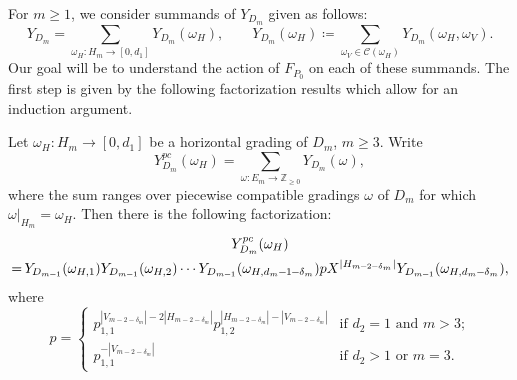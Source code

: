 \documentclass[ALCO,ThmDefs,Unicode,epreuves]{cedram}
\newcommand{\cC}{\mathcal{C}}
\newcommand{\ZZ}{\mathbb{Z}}
\newcommand*{\mk}{\mkern -1mu}
\newcommand*{\Mk}{\mkern -2mu}
\begin{document}
For $m\ge1$, we consider summands of $Y_{D_m}$ given as follows:
\begin{equation}
 \label{eq:Y decomposition}
 Y_{D_m}=\sum_{\omega_H:H_m\to[0,d_1]}Y_{D_m}(\omega_H),\qquad Y_{D_m}(\omega_H)\coloneqq \sum_{\omega_V\in\cC(\omega_H)}Y_{D_m}(\omega_H,\omega_V).
\end{equation}
Our goal will be to understand the action of $F_{P_0}$ on each of these summands.
The first step is given by the following factorization results which allow for an induction argument.
\begin{lemma}
 \label{le:piecewise compatible factorization 1}
 Let $\omega_H:H_m\to[0,d_1]$ be a horizontal grading of $D_m$, $m\ge3$.
 Write 
 \[Y_{D_m}^{pc}(\omega_H)=\sum\limits_{\omega:E_m\to\ZZ_{\ge0}}Y_{D_m}(\omega),\]
 where the sum ranges over piecewise compatible gradings $\omega$ of $D_m$ for which $\omega|_{H_m}=\omega_H$.
 Then there is the following factorization:
 \begin{multline}
 \label{eq:piecewise compatible factorization 1}
 Y_{D_m}^{pc}(\omega_H)\\
 =\Mk Y_{\mk D_{m\mk -\mk 1}}(\omega_{H,1})Y_{D_{m\mk -\mk 1}}(\omega_{H,2})\cdots Y_{D_{m\mk -\mk 1}}(\omega_{H,d_m\mk -\mk 1\mk -\mk \delta_m})pX^{|H_{m\mk -\mk 2\mk -\mk \delta_m}|} Y_{D_{m\mk -\mk 1}}(\omega_{H,d_m\mk -\mk \delta_m}),
 \end{multline}
 where 
 \[p=\begin{cases} p_{1,1}^{|V_{m-2-\delta_m}|-2|H_{m-2-\delta_m}|}p_{1,2}^{|H_{m-2-\delta_m}|-|V_{m-2-\delta_m}|} & \text{if $d_2=1$ and $m>3$;}\\ p_{1,1}^{-|V_{m-2-\delta_m}|} & \text{if $d_2>1$ or $m=3$.}\end{cases}\]
\end{lemma}
\end{document}
